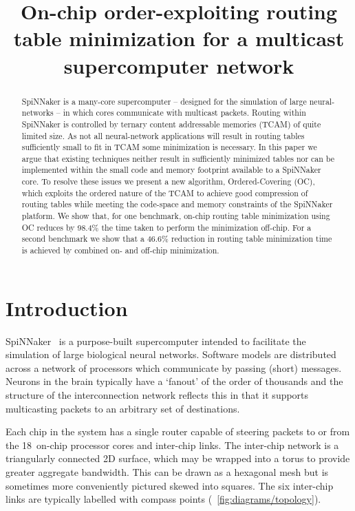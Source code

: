 \documentclass[conference]{IEEEtran}
\title{On-chip order-exploiting routing table minimization for a multicast supercomputer network}
\author{%
  \IEEEauthorblockN{Andrew~Mundy, Jonathan~Heathcote and Jim~D.~Garside}
  \IEEEauthorblockA{School of Computer Science,
                    University of Manchester, UK}
}
\begin{document}
  \maketitle

  \begin{abstract}
SpiNNaker is a many-core supercomputer -- designed for the simulation of large neural-networks -- in which cores communicate with multicast packets.
Routing within SpiNNaker is controlled by ternary content addressable memories (TCAM) of quite limited size.
As not all neural-network applications will result in routing tables sufficiently small to fit in TCAM some minimization is necessary.
In this paper we argue that existing techniques neither result in sufficiently minimized tables nor can be implemented within the small code and memory footprint available to a SpiNNaker core.
To resolve these issues we present a new algorithm, Ordered-Covering (OC), which exploits the ordered nature of the TCAM to achieve good compression of routing tables while meeting the code-space and memory constraints of the SpiNNaker platform.
We show that, for one benchmark, on-chip routing table minimization using OC reduces by 98.4\% the time taken to perform the minimization off-chip.
For a second benchmark we show that a 46.6\% reduction in routing table minimization time is achieved by combined on- and off-chip minimization.
  \end{abstract}

  \section{Introduction}

SpiNNaker~\parencite{Furber2014} is a purpose-built supercomputer intended to facilitate the simulation of large biological neural networks.
Software models are distributed across a network of processors which communicate by passing (short) messages.
Neurons in the brain typically have a `fanout' of the order of thousands \parencite{Kung1988} and the structure of the interconnection network reflects this in that it supports multicasting packets to an arbitrary set of destinations.

Each chip in the system has a single router capable of steering packets to or from the 18~on-chip processor cores and inter-chip links.
The inter-chip network is a triangularly connected 2D surface, which may be wrapped into a torus to provide greater aggregate bandwidth.
This can be drawn as a hexagonal mesh but is sometimes more conveniently pictured skewed into squares.
The six inter-chip links are typically labelled with compass points (\figurename~\ref{fig:diagrams/topology}).
\end{document}
